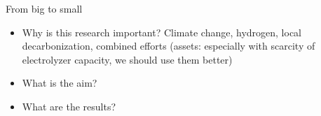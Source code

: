 From big to small
\begin{itemize}
    \item Why is this research important? Climate change, hydrogen, local decarbonization, combined efforts (assets: especially with scarcity of electrolyzer capacity, we should use them better)
    \item What is the aim?
    \item What are the results?
\end{itemize}